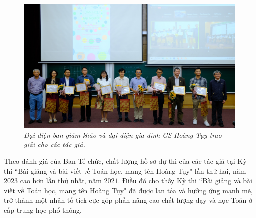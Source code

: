 	\begin{figure}[H]
		\vspace*{5pt}
		\centering
		\captionsetup{labelformat= empty, justification=centering}
		\includegraphics[width= 1\linewidth]{10}
		\caption{\small\textit{\color{doisongtoanhoc}Đại diện ban giám khảo và đại diện gia đình GS Hoàng Tụy trao giải cho các tác giả.}}
		\vspace*{-10pt}
	\end{figure}
	\begin{multicols}{2}
	Theo đánh giá của Ban Tổ chức, chất lượng hồ sơ dự thi của các tác giả tại Kỳ thi ``Bài giảng và bài viết về Toán học, mang tên Hoàng Tụy" lần thứ hai, năm $2023$ cao hơn lần thứ nhất, năm $2021$. Điều đó cho thấy Kỳ thi ``Bài giảng và bài viết về Toán học, mang tên Hoàng Tụy" đã được lan tỏa và hưởng ứng mạnh mẽ, trở thành một nhân tố tích cực góp phần nâng cao chất lượng dạy và học Toán ở cấp trung học phổ thông. 
\end{multicols}